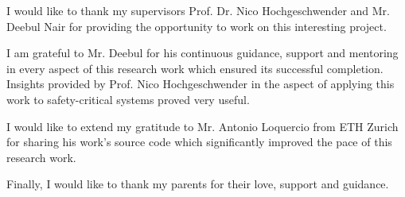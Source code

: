 




    \begin{acknowledgements}
	I would like to thank my supervisors Prof. Dr. Nico Hochgeschwender and Mr. Deebul Nair for providing the opportunity to work on this interesting project.

	I am grateful to Mr. Deebul for his continuous guidance, support and mentoring in every aspect of this research work which ensured its successful completion. Insights provided by Prof. Nico Hochgeschwender in the aspect of applying this work to safety-critical systems proved very useful.

	I would like to extend my gratitude to Mr. Antonio Loquercio from ETH Zurich for sharing his work's source code which significantly improved the pace of this research work.

	Finally, I would like to thank my parents for their love, support and guidance. 
    \end{acknowledgements}


